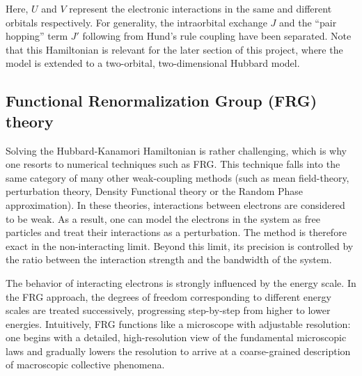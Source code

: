 \documentclass[11pt]{article}
\begin{document}
\noindent Here, $U$ and $V$ represent the electronic interactions in the same and different orbitals respectively. For generality, the intraorbital exchange $J$ and the ``pair hopping'' term $J'$ following from Hund's rule coupling have been separated.  
Note that this Hamiltonian is relevant for the later section of this project, where the model is extended to a two-orbital, two-dimensional Hubbard model.

\subsection{Functional Renormalization Group (FRG) theory}

Solving the Hubbard-Kanamori Hamiltonian is rather challenging, which is why one resorts to numerical techniques such as FRG. This technique falls into the same category of many other weak-coupling methods (such as mean field-theory\cite{kadanoff2009more}, perturbation theory\cite{nagaosa2013quantum}, Density Functional theory\cite{kohn1965self} or the Random Phase approximation\cite{bohm1951collective}).
In these theories, interactions between electrons are considered to be weak. As a result, one can model the electrons in the system as free particles 
and treat their interactions as a perturbation. The method is therefore exact in the non-interacting limit. Beyond this limit, its precision is controlled by the ratio between the interaction
strength and the bandwidth of the system. \par

\medskip

\noindent The behavior of interacting electrons is strongly influenced by the energy scale. In the FRG approach, the degrees of freedom corresponding to different energy scales are treated successively, 
progressing step-by-step from higher to lower energies.
Intuitively, FRG functions like a microscope with adjustable resolution: one begins with a detailed, high-resolution view of the fundamental microscopic laws and gradually lowers the resolution to arrive at a coarse-grained description of macroscopic collective phenomena.
\medskip
\end{document}
